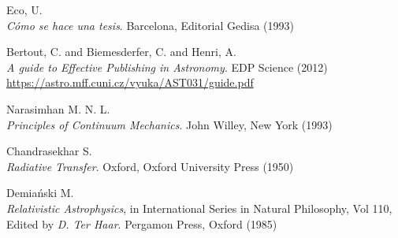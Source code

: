 \documentclass[spanish,notitlepage,letterpaper,11pt]{article} %
\begin{document}
\begin{thebibliography}{}

 Eco, U. \\
\textit{C{\'o}mo se hace una tesis}. Barcelona, Editorial Gedisa (1993)

 Bertout, C. and Biemesderfer, C. and Henri, A.  \\
\textit{A guide to Effective Publishing in Astronomy}. EDP Science (2012) \\
\url{https://astro.mff.cuni.cz/vyuka/AST031/guide.pdf}

Narasimhan M. N. L.  \\
\textit{Principles of Continuum Mechanics}. John Willey, New York (1993)

Chandrasekhar S.  \\
\textit{Radiative Transfer}. Oxford, Oxford University Press (1950)

Demia\'{n}ski M. \\
\textit{Relativistic Astrophysics}, in International Series in Natural Philosophy, 
Vol 110, Edited by  \textit{D. Ter Haar}. Pergamon Press, Oxford (1985)

\end{thebibliography}
\end{document}
